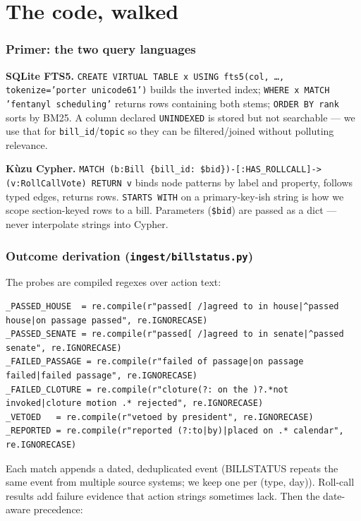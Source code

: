 \documentclass[11pt]{article}
\newcommand{\file}[1]{\texttt{#1}}
\newcommand{\code}[1]{\texttt{#1}}
\begin{document}
\part{The code, walked}

\section{Primer: the two query languages}
\label{sec:primer}

\textbf{SQLite FTS5.} \code{CREATE VIRTUAL TABLE x USING fts5(col, \ldots,
tokenize='porter unicode61')} builds the inverted index;
\code{WHERE x MATCH 'fentanyl scheduling'} returns rows containing both
stems; \code{ORDER BY rank} sorts by BM25. A column declared
\code{UNINDEXED} is stored but not searchable --- we use that for
\code{bill\_id}/\code{topic} so they can be filtered/joined without
polluting relevance.

\textbf{K\`uzu Cypher.} \code{MATCH (b:Bill \{bill\_id: \$bid\})-[:HAS\_ROLLCALL]->(v:RollCallVote)
RETURN v} binds node patterns by label and property, follows typed edges,
returns rows. \code{STARTS WITH} on a primary-key-ish string is how we scope
section-keyed rows to a bill. Parameters (\code{\$bid}) are passed as a dict
--- never interpolate strings into Cypher.

\section{Outcome derivation (\file{ingest/billstatus.py})}
\label{sec:outcomecode}

The probes are compiled regexes over action text:

\begin{lstlisting}
_PASSED_HOUSE  = re.compile(r"passed[ /]agreed to in house|^passed house|on passage passed", re.IGNORECASE)
_PASSED_SENATE = re.compile(r"passed[ /]agreed to in senate|^passed senate", re.IGNORECASE)
_FAILED_PASSAGE = re.compile(r"failed of passage|on passage failed|failed passage", re.IGNORECASE)
_FAILED_CLOTURE = re.compile(r"cloture(?: on the )?.*not invoked|cloture motion .* rejected", re.IGNORECASE)
_VETOED   = re.compile(r"vetoed by president", re.IGNORECASE)
_REPORTED = re.compile(r"reported (?:to|by)|placed on .* calendar", re.IGNORECASE)
\end{lstlisting}

Each match appends a dated, deduplicated event (BILLSTATUS repeats the same
event from multiple source systems; we keep one per (type, day)). Roll-call
results add failure evidence that action strings sometimes lack. Then the
date-aware precedence:
\end{document}
